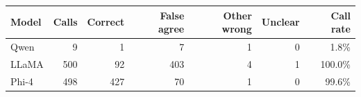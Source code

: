 \begin{tabular}{@{}lrrrrrr@{}}
\toprule
Model & Calls & Correct & False agree & Other wrong & Unclear & Call rate \\
\midrule
Qwen & 9 & 1 & 7 & 1 & 0 & 1.8\% \\
LLaMA & 500 & 92 & 403 & 4 & 1 & 100.0\% \\
Phi-4 & 498 & 427 & 70 & 1 & 0 & 99.6\% \\
\bottomrule
\end{tabular}
